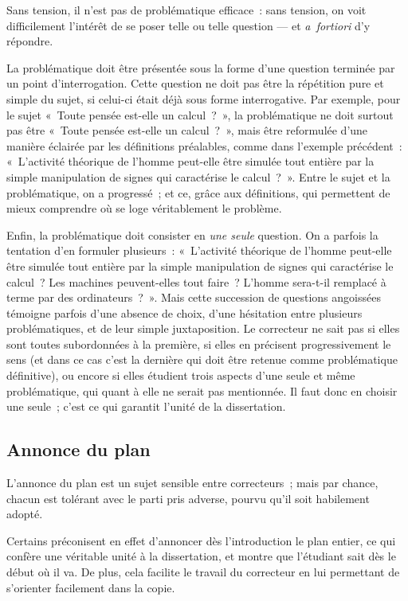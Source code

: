 \documentclass[a4paper]{article}
\begin{document}
Sans tension, il n'est pas de problématique efficace : sans tension, on
voit difficilement l'intérêt de se poser telle ou telle question --- et
\emph{a fortiori} d'y répondre.

La problématique doit être présentée sous la forme d'une question
terminée par un point d'interrogation. Cette question ne doit pas être
la répétition pure et simple du sujet, si celui-ci était déjà sous forme
interrogative. Par exemple, pour le sujet « Toute pensée est-elle un
calcul ? », la problématique ne doit surtout pas être « Toute pensée
est-elle un calcul ? », mais être reformulée d'une manière éclairée par
les définitions préalables, comme dans l'exemple précédent : « L'activité
théorique de l'homme peut-elle être simulée tout entière par la simple
manipulation de signes qui caractérise le calcul ? ». Entre le sujet et
la problématique, on a progressé ; et ce, grâce aux définitions, qui
permettent de mieux comprendre où se loge véritablement le problème.

Enfin, la problématique doit consister en \emph{une seule} question. On a
parfois la tentation d'en formuler plusieurs : « L'activité théorique de
l'homme peut-elle être simulée tout entière par la simple manipulation
de signes qui caractérise le calcul ? Les machines peuvent-elles tout
faire ? L'homme sera-t-il remplacé à terme par des ordinateurs ? ». Mais
cette succession de questions angoissées témoigne parfois d'une absence
de choix, d'une hésitation entre plusieurs problématiques, et de leur
simple juxtaposition. Le correcteur ne sait pas si elles sont toutes
subordonnées à la première, si elles en précisent progressivement le
sens (et dans ce cas c'est la dernière qui doit être retenue comme
problématique définitive), ou encore si elles étudient trois aspects
d'une seule et même problématique, qui quant à elle ne serait pas
mentionnée. Il faut donc en choisir une seule ; c'est ce qui garantit
l'unité de la dissertation.
\subsection{Annonce du plan}
\label{sec-2-3}


L'annonce du plan est un sujet sensible entre correcteurs ; mais par
chance, chacun est tolérant avec le parti pris adverse, pourvu qu'il
soit habilement adopté.

Certains préconisent en effet d'annoncer dès l'introduction le plan
entier, ce qui confère une véritable unité à la dissertation, et montre
que l'étudiant sait dès le début où il va. De plus, cela facilite le
travail du correcteur en lui permettant de s'orienter facilement dans la
copie.
\end{document}
